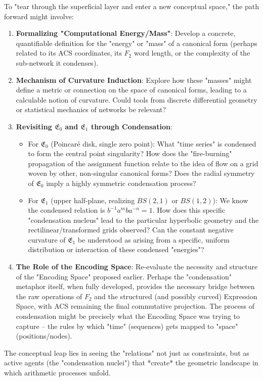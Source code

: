 \documentclass[12pt, a4paper]{article}
\theoremstyle{definition}
\begin{document}
To "tear through the superficial layer and enter a new conceptual space," the path forward might involve:
\begin{enumerate}
    \item \textbf{Formalizing "Computational Energy/Mass"}: Develop a concrete, quantifiable definition for the "energy" or "mass" of a canonical form (perhaps related to its ACS coordinates, its $F_2$ word length, or the complexity of the sub-network it condenses).
    \item \textbf{Mechanism of Curvature Induction}: Explore how these "masses" might define a metric or connection on the space of canonical forms, leading to a calculable notion of curvature. Could tools from discrete differential geometry or statistical mechanics of networks be relevant?
    \item \textbf{Revisiting $\mathfrak{E}_0$ and $\mathfrak{E}_1$ through Condensation}:
        \begin{itemize}
            \item For $\mathfrak{E}_0$ (Poincaré disk, single zero point): What "time series" is condensed to form the central point singularity? How does the "fire-burning" propagation of the assignment function relate to the idea of flow on a grid woven by other, non-singular canonical forms? Does the radial symmetry of $\mathfrak{E}_0$ imply a highly symmetric condensation process?
            \item For $\mathfrak{E}_1$ (upper half-plane, realizing $BS(2,1)$ or $BS(1,2)$): We know the condensed relation is $b^{-1}a^m b a^{-n}=1$. How does this specific "condensation nucleus" lead to the particular hyperbolic geometry and the rectilinear/transformed grids observed? Can the constant negative curvature of $\mathfrak{E}_1$ be understood as arising from a specific, uniform distribution or interaction of these condensed "energies"?
        \end{itemize}
    \item \textbf{The Role of the Encoding Space}: Re-evaluate the necessity and structure of the "Encoding Space" proposed earlier. Perhaps the "condensation" metaphor itself, when fully developed, provides the necessary bridge between the raw operations of $F_2$ and the structured (and possibly curved) Expression Space, with ACS remaining the final commutative projection. The process of condensation might be precisely what the Encoding Space was trying to capture – the rules by which "time" (sequences) gets mapped to "space" (positions/nodes).
\end{enumerate}

The conceptual leap lies in seeing the "relations" not just as constraints, but as active agents (the "condensation nuclei") that *create* the geometric landscape in which arithmetic processes unfold.
\end{document}
